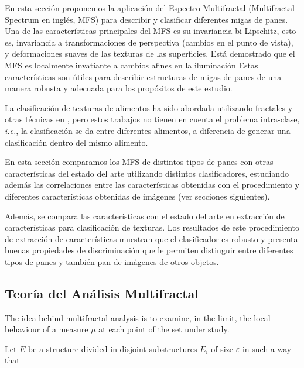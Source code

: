 En esta sección proponemos la aplicación del Espectro Multifractal (Multifractal Spectrum en inglés, MFS) para describir y clasificar diferentes migas de panes.
Una de las características principales del MFS es su invariancia bi-Lipschitz, esto es,
invariancia a transformaciones de perspectiva (cambios en el punto de vista), y deformaciones suaves de las texturas de las superficies.
Está demostrado que el MFS es localmente invatiante a cambios afines en la iluminación
Estas características son útiles para describir estructuras de migas de panes de una manera robusta y adecuada para los propósitos de este estudio.


La clasificación de texturas de alimentos ha sido abordada utilizando fractales y otras técnicas en \cite{Zong2010,Bosch2011}, pero estos trabajos no tienen en cuenta el problema intra-clase, {\em i.e.}, la clasificación se da entre diferentes alimentos, a diferencia de generar una clasificación dentro del mismo alimento.


En esta sección comparamos los MFS de distintos tipos de panes con otras características del estado del arte utilizando distintos clasificadores, estudiando además las correlaciones entre las características obtenidas con el procedimiento y diferentes características obtenidas de imágenes (ver secciones siguientes).

Además, se compara las características con el estado del arte en extracción de características para clasificación de texturas.
Los resultados de este procedimiento de extracción de características muestran que el clasificador es robusto y presenta buenas propiedades de discriminación que le permiten distinguir entre diferentes tipos de panes y también pan de imágenes de otros objetos.

\subsection{Teoría del Análisis Multifractal}

The idea behind multifractal analysis is to examine, in the limit, the local behaviour of a measure $\mu$ at each point of the set under study. 

Let $E$ be a structure divided in disjoint substructures $E_{i}$ of size $\varepsilon$ in such a way that 

